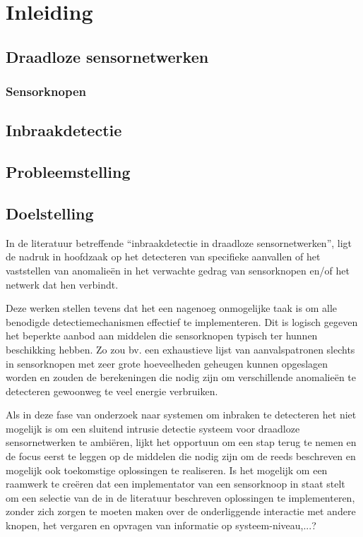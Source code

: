 
\chapter{Inleiding}
\label{inleiding}

\TODO

\section{Draadloze sensornetwerken}

\TODO

\subsection{Sensorknopen}

\TODO

\section{Inbraakdetectie}

\TODO

\section{Probleemstelling}

\TODO

\section{Doelstelling}

In de literatuur betreffende ``inbraakdetectie in draadloze sensornetwerken'',
ligt de nadruk in hoofdzaak op het detecteren van specifieke aanvallen of het
vaststellen van anomalie\"en in het verwachte gedrag van sensorknopen en/of het
netwerk dat hen verbindt.

Deze werken stellen tevens dat het een nagenoeg onmogelijke taak is om alle
benodigde detectiemechanismen effectief te implementeren. Dit is logisch
gegeven het beperkte aanbod aan middelen die sensorknopen typisch ter hunnen
beschikking hebben. Zo zou bv. een exhaustieve lijst van aanvalspatronen
slechts in sensorknopen met zeer grote hoeveelheden geheugen kunnen opgeslagen
worden en zouden de berekeningen die nodig zijn om verschillende anomalie\"en
te detecteren gewoonweg te veel energie verbruiken.

Als in deze fase van onderzoek naar systemen om inbraken te detecteren het niet
mogelijk is om een sluitend intrusie detectie systeem voor draadloze
sensornetwerken te ambi\"eren, lijkt het opportuun om een stap terug te nemen
en de focus eerst te leggen op de middelen die nodig zijn om de reeds
beschreven en mogelijk ook toekomstige oplossingen te realiseren. Is het
mogelijk om een raamwerk te cre\"eren dat een implementator van een sensorknoop
in staat stelt om een selectie van de in de literatuur beschreven oplossingen
te implementeren, zonder zich zorgen te moeten maken over de onderliggende
interactie met andere knopen, het vergaren en opvragen van informatie op
systeem-niveau,...?

